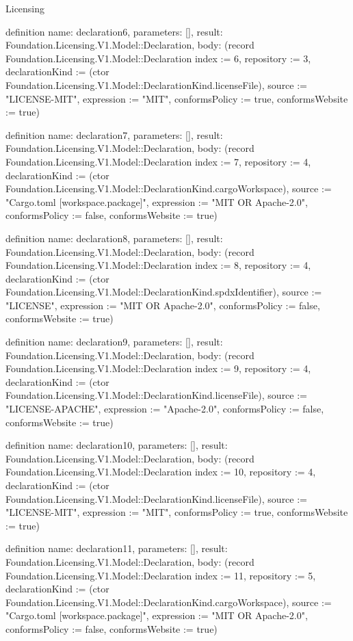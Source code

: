 \begin{lexlean}{Licensing}
\begin{semanticmodule}
definition{
  name: declaration6,
  parameters: [],
  result: Foundation.Licensing.V1.Model::Declaration,
  body: (record Foundation.Licensing.V1.Model::Declaration {index := 6, repository := 3, declarationKind := (ctor Foundation.Licensing.V1.Model::DeclarationKind.licenseFile), source := "LICENSE-MIT", expression := "MIT", conformsPolicy := true, conformsWebsite := true})
}

definition{
  name: declaration7,
  parameters: [],
  result: Foundation.Licensing.V1.Model::Declaration,
  body: (record Foundation.Licensing.V1.Model::Declaration {index := 7, repository := 4, declarationKind := (ctor Foundation.Licensing.V1.Model::DeclarationKind.cargoWorkspace), source := "Cargo.toml [workspace.package]", expression := "MIT OR Apache-2.0", conformsPolicy := false, conformsWebsite := true})
}

definition{
  name: declaration8,
  parameters: [],
  result: Foundation.Licensing.V1.Model::Declaration,
  body: (record Foundation.Licensing.V1.Model::Declaration {index := 8, repository := 4, declarationKind := (ctor Foundation.Licensing.V1.Model::DeclarationKind.spdxIdentifier), source := "LICENSE", expression := "MIT OR Apache-2.0", conformsPolicy := false, conformsWebsite := true})
}

definition{
  name: declaration9,
  parameters: [],
  result: Foundation.Licensing.V1.Model::Declaration,
  body: (record Foundation.Licensing.V1.Model::Declaration {index := 9, repository := 4, declarationKind := (ctor Foundation.Licensing.V1.Model::DeclarationKind.licenseFile), source := "LICENSE-APACHE", expression := "Apache-2.0", conformsPolicy := false, conformsWebsite := true})
}

definition{
  name: declaration10,
  parameters: [],
  result: Foundation.Licensing.V1.Model::Declaration,
  body: (record Foundation.Licensing.V1.Model::Declaration {index := 10, repository := 4, declarationKind := (ctor Foundation.Licensing.V1.Model::DeclarationKind.licenseFile), source := "LICENSE-MIT", expression := "MIT", conformsPolicy := true, conformsWebsite := true})
}

definition{
  name: declaration11,
  parameters: [],
  result: Foundation.Licensing.V1.Model::Declaration,
  body: (record Foundation.Licensing.V1.Model::Declaration {index := 11, repository := 5, declarationKind := (ctor Foundation.Licensing.V1.Model::DeclarationKind.cargoWorkspace), source := "Cargo.toml [workspace.package]", expression := "MIT OR Apache-2.0", conformsPolicy := false, conformsWebsite := true})
}


\end{semanticmodule}
\end{lexlean}

